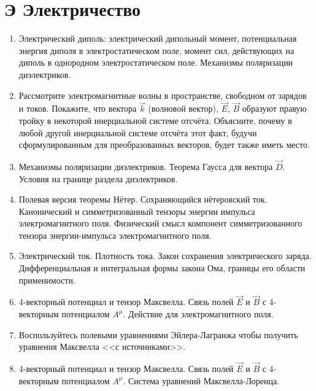 \documentclass[12pt]{article}
\newcommand{\eL}[1]{\label{Э-#1}}
\def\twodigits#1{%
\ifnum#1<10 0\fi 
\number#1}
\begin{document}
%
\section*{Э Электричество}
%

\begin{enumerate}[label={\textbf{Э-\protect\twodigits{\theenumi}}}]

\item\eL{1} 
Электрический диполь: электрический дипольный момент, потенциальная энергия диполя в электростатическом поле, момент сил, действующих на диполь в однородном электростатическом поле. Механизмы поляризации диэлектриков.

\item\eL{2}
Рассмотрите электромагнитные волны в пространстве, свободном от зарядов и токов. Покажите, что вектора $\vec{k}$ (волновой вектор), $\vec{E}$, $\vec{B}$ образуют правую тройку в некоторой инерциальной системе отсчёта. Объясните, почему в любой другой инерциальной системе отсчёта этот факт, будучи сформулированным для преобразованных векторов, будет также иметь место.

\item\eL{3}
Механизмы поляризации диэлектриков. Теорема Гаусса для вектора $\vec{D}$. Условия на границе раздела диэлектриков.

\item\eL{4}
Полевая версия теоремы Нётер. Сохраняющийся нётеровский ток. Канонический и симметризованный тензоры энергии импульса электромагнитного поля. Физический смысл компонент симметризованного тензора энергии-импульса электромагнитного поля.

\item\eL{5}
Электрический ток. Плотность тока. Закон сохранения электрического заряда. Дифференциальная и интегральная формы закона Ома, границы его области применимости.

\item\eL{6}
4-векторный потенциал и тензор Максвелла. Связь полей $\vec{E}$ и $\vec{B}$ с 4-векторным потенциалом $A^\mu$. Действие для электромагнитного поля.

\item\eL{7}
Воспользуйтесь полевыми уравнениями Эйлера-Лагранжа чтобы получить уравнения Максвелла <<с источниками>>.

\item\eL{8}
4-векторный потенциал и тензор Максвелла. Связь полей $\vec{E}$ и $\vec{B}$ с 4-векторным потенциалом $A^\mu$. Система уравнений Максвелла-Лоренца.


\end{enumerate}
\end{document}
